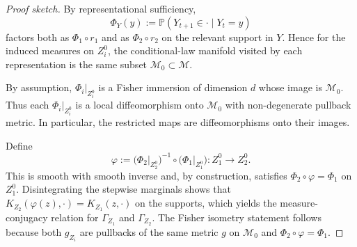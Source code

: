 \documentclass[11pt]{article}
\newcommand{\1}{\mathbf{1}}
\begin{document}
\begin{proof}[Proof sketch]
By representational sufficiency,
\[
  \Phi_Y(y) := \mathbb{P}(Y_{t+1}\in\cdot\mid Y_t=y)
\]
factors both as $\Phi_1 \circ r_1$ and as $\Phi_2 \circ r_2$ on the relevant support in $Y$. Hence for the induced measures on $Z_i^0$, the conditional-law manifold visited by each representation is the same subset $\mathcal{M}_0 \subset \mathcal{M}$.

By assumption, $\Phi_i\big|_{Z_i^0}$ is a Fisher immersion of dimension $d$ whose image is $\mathcal{M}_0$. Thus each $\Phi_i\big|_{Z_i^0}$ is a local diffeomorphism onto $\mathcal{M}_0$ with non-degenerate pullback metric. In particular, the restricted maps are diffeomorphisms onto their images.

Define
\[
  \varphi
  :=
  \bigl(\Phi_2\big|_{Z_2^0}\bigr)^{-1} \circ \bigl(\Phi_1\big|_{Z_1^0}\bigr)
  : Z_1^0 \to Z_2^0.
\]
This is smooth with smooth inverse and, by construction, satisfies $\Phi_2 \circ \varphi = \Phi_1$ on $Z_1^0$. Disintegrating the stepwise marginals shows that $K_{Z_2}(\varphi(z),\cdot) = K_{Z_1}(z,\cdot)$ on the supports, which yields the measure-conjugacy relation for $\Gamma_{Z_1}$ and $\Gamma_{Z_2}$. The Fisher isometry statement follows because both $g_{Z_i}$ are pullbacks of the same metric $g$ on $\mathcal{M}_0$ and $\Phi_2 \circ \varphi = \Phi_1$.
\end{proof}
\end{document}

